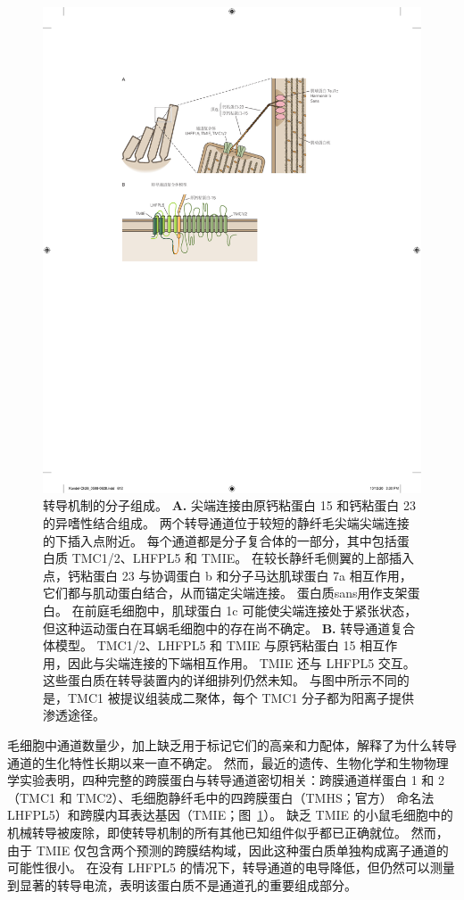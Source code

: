 \begin{figure}[htbp]
	\centering
	\includegraphics[width=1.0\linewidth]{chap26/fig_26_10}
	\caption{转导机制的分子组成。
		\textbf{A.} 尖端连接由原钙粘蛋白 15 和钙粘蛋白 23 的异嗜性结合组成。
		两个转导通道位于较短的静纤毛尖端尖端连接的下插入点附近。
		每个通道都是分子复合体的一部分，其中包括蛋白质 TMC1/2、LHFPL5 和 TMIE。
		在较长静纤毛侧翼的上部插入点，钙粘蛋白 23 与协调蛋白 b 和分子马达肌球蛋白 7a 相互作用，它们都与肌动蛋白结合，从而锚定尖端连接。
		蛋白质sans用作支架蛋白。
		在前庭毛细胞中，肌球蛋白 1c 可能使尖端连接处于紧张状态，但这种运动蛋白在耳蜗毛细胞中的存在尚不确定。
		\textbf{B.} 转导通道复合体模型。
		TMC1/2、LHFPL5 和 TMIE 与原钙粘蛋白 15 相互作用，因此与尖端连接的下端相互作用。
		TMIE 还与 LHFPL5 交互。
		这些蛋白质在转导装置内的详细排列仍然未知。
		与图中所示不同的是，TMC1 被提议组装成二聚体，每个 TMC1 分子都为阳离子提供渗透途径\cite{wu2016molecular,pan2018tmc1}。}
	\label{fig:26_10}
\end{figure}


毛细胞中通道数量少，加上缺乏用于标记它们的高亲和力配体，解释了为什么转导通道的生化特性长期以来一直不确定。
然而，最近的遗传、生物化学和生物物理学实验表明，四种完整的跨膜蛋白与转导通道密切相关：跨膜通道样蛋白 1 和 2（TMC1 和 TMC2）、毛细胞静纤毛中的四跨膜蛋白（TMHS；官方） 命名法 LHFPL5）和跨膜内耳表达基因（TMIE；图~\ref{fig:26_10}）。
缺乏 TMIE 的小鼠毛细胞中的机械转导被废除，即使转导机制的所有其他已知组件似乎都已正确就位。
然而，由于 TMIE 仅包含两个预测的跨膜结构域，因此这种蛋白质单独构成离子通道的可能性很小。
在没有 LHFPL5 的情况下，转导通道的电导降低，但仍然可以测量到显著的转导电流，表明该蛋白质不是通道孔的重要组成部分。


